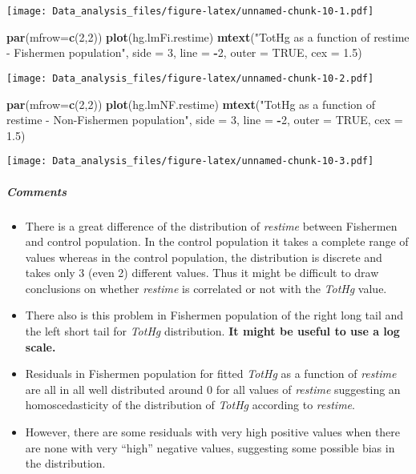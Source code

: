 \documentclass[12pt,]{article}
\newenvironment{Shaded}{\begin{snugshade}}{\end{snugshade}}
\newcommand{\KeywordTok}[1]{\textcolor[rgb]{0.13,0.29,0.53}{\textbf{#1}}}
\newcommand{\DataTypeTok}[1]{\textcolor[rgb]{0.13,0.29,0.53}{#1}}
\newcommand{\DecValTok}[1]{\textcolor[rgb]{0.00,0.00,0.81}{#1}}
\newcommand{\FloatTok}[1]{\textcolor[rgb]{0.00,0.00,0.81}{#1}}
\newcommand{\StringTok}[1]{\textcolor[rgb]{0.31,0.60,0.02}{#1}}
\newcommand{\OtherTok}[1]{\textcolor[rgb]{0.56,0.35,0.01}{#1}}
\newcommand{\OperatorTok}[1]{\textcolor[rgb]{0.81,0.36,0.00}{\textbf{#1}}}
\newcommand{\NormalTok}[1]{#1}
\let\oldsubparagraph\subparagraph
\renewcommand{\subparagraph}[1]{\oldsubparagraph{#1}\mbox{}}
\begin{document}
\texttt{[image: Data\_analysis\_files/figure-latex/unnamed-chunk-10-1.pdf]}

\begin{Shaded}
\begin{Highlighting}[]
\KeywordTok{par}\NormalTok{(}\DataTypeTok{mfrow=}\KeywordTok{c}\NormalTok{(}\DecValTok{2}\NormalTok{,}\DecValTok{2}\NormalTok{))}
\KeywordTok{plot}\NormalTok{(hg.lmFi.restime)}
\KeywordTok{mtext}\NormalTok{(}\StringTok{"TotHg as a function of restime - Fishermen population"}\NormalTok{, }\DataTypeTok{side =} \DecValTok{3}\NormalTok{, }\DataTypeTok{line =} \OperatorTok{-}\DecValTok{2}\NormalTok{, }\DataTypeTok{outer =} \OtherTok{TRUE}\NormalTok{, }\DataTypeTok{cex =} \FloatTok{1.5}\NormalTok{)}
\end{Highlighting}
\end{Shaded}

\texttt{[image: Data\_analysis\_files/figure-latex/unnamed-chunk-10-2.pdf]}

\begin{Shaded}
\begin{Highlighting}[]
\KeywordTok{par}\NormalTok{(}\DataTypeTok{mfrow=}\KeywordTok{c}\NormalTok{(}\DecValTok{2}\NormalTok{,}\DecValTok{2}\NormalTok{))}
\KeywordTok{plot}\NormalTok{(hg.lmNF.restime)}
\KeywordTok{mtext}\NormalTok{(}\StringTok{"TotHg as a function of restime - Non-Fishermen population"}\NormalTok{, }\DataTypeTok{side =} \DecValTok{3}\NormalTok{, }\DataTypeTok{line =} \OperatorTok{-}\DecValTok{2}\NormalTok{, }\DataTypeTok{outer =} \OtherTok{TRUE}\NormalTok{, }\DataTypeTok{cex =} \FloatTok{1.5}\NormalTok{)}
\end{Highlighting}
\end{Shaded}

\texttt{[image: Data\_analysis\_files/figure-latex/unnamed-chunk-10-3.pdf]}

\subparagraph{Comments}\label{comments-1}

\begin{itemize}
\item
  There is a great difference of the distribution of \emph{restime}
  between Fishermen and control population. In the control population it
  takes a complete range of values whereas in the control population,
  the distribution is discrete and takes only 3 (even 2) different
  values. Thus it might be difficult to draw conclusions on whether
  \emph{restime} is correlated or not with the \emph{TotHg} value.
\item
  There also is this problem in Fishermen population of the right long
  tail and the left short tail for \emph{TotHg} distribution. \textbf{It
  might be useful to use a log scale.}
\item
  Residuals in Fishermen population for fitted \emph{TotHg} as a
  function of \emph{restime} are all in all well distributed around 0
  for all values of \emph{restime} suggesting an homoscedasticity of the
  distribution of \emph{TotHg} according to \emph{restime}.
\item
  However, there are some residuals with very high positive values when
  there are none with very ``high'' negative values, suggesting some
  possible bias in the distribution.
\end{itemize}
\end{document}
